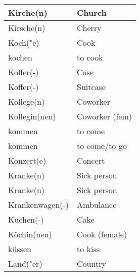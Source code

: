 \documentclass{article}
\begin{document}
\begin{minipage}{0.48\textwidth}
\begin{tabular}{|>{\raggedright\arraybackslash}p{3.5cm}|>{\raggedright\arraybackslash}p{3.5cm}|}
        Kirche(n) & Church \\\hline
        Kirsche(n) & Cherry \\\hline
        Koch("e) & Cook \\\hline
        kochen & to cook \\\hline
        Koffer(-) & Case \\\hline
        Koffer(-) & Suitcase \\\hline
        Kollege(n) & Coworker \\\hline
        Kollegin(nen) & Coworker (fem) \\\hline
        kommen & to come \\\hline
        kommen & to come/to go \\\hline
        Konzert(e) & Concert \\\hline
        Kranke(n) & Sick person \\\hline
        Kranke(n) & Sick person \\\hline
        Krankenwagen(-) & Ambulance \\\hline
        Kuchen(-) & Cake \\\hline
        Köchin(nen) & Cook (female) \\\hline
        küssen & to kiss \\\hline
        Land("er) & Country \\\hline
    \end{tabular}
\end{minipage}%
\hfill
\end{document}
